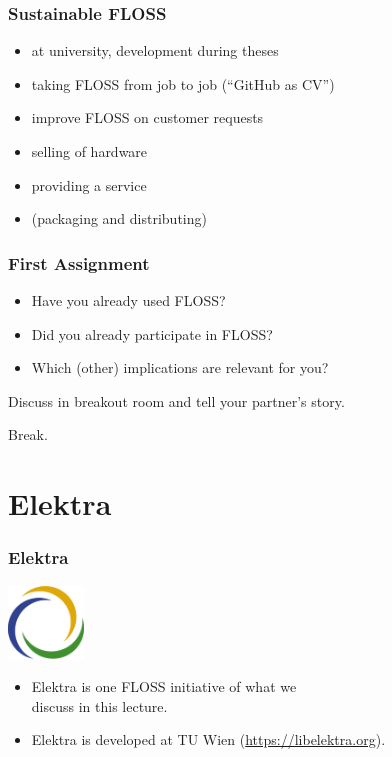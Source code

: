\begin{frame}[fragile]
	\frametitle{Sustainable FLOSS}

	\begin{itemize}
		\item at university, development during theses
		\item taking FLOSS from job to job (``GitHub as CV'')
		\item improve FLOSS on customer requests
		\item selling of hardware
		\item providing a service
		\item (packaging and distributing)
	\end{itemize}
\end{frame}

\begin{assignment}
	\frametitle{First Assignment}
	\begin{itemize}
		\item Have you already used FLOSS?
		\item Did you already participate in FLOSS?
		\item Which (other) implications are relevant for you?
	\end{itemize}
	\begin{task}
	Discuss in breakout room and tell your partner's story.
	\end{task}
\end{assignment}

\begin{assignment}
	\begin{task}
	Break.
	\end{task}
\end{assignment}

\section{Elektra}

\begin{frame}
	\frametitle{Elektra}
	\hfill \includegraphics[width=2cm]{../figures/logo}
	\vspace{-1cm}
	\begin{itemize}
		\item Elektra is one FLOSS initiative of what we \\ discuss in this lecture.
		\item Elektra is developed at TU Wien (\url{https://libelektra.org}).
	\end{itemize}
\end{frame}

